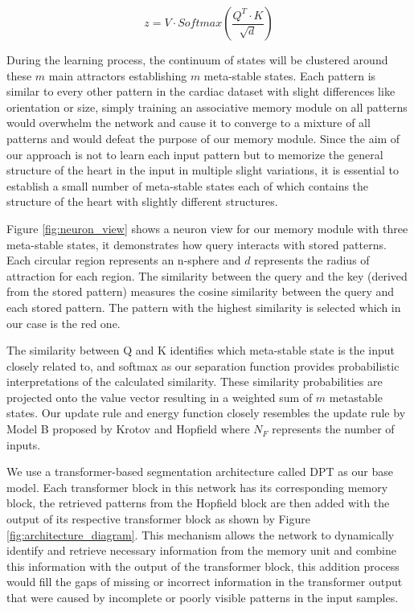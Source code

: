 \documentclass[preprint,12pt]{elsarticle}
\begin{document}
\begin{equation}
    z = V \cdot Softmax \left(\frac{Q^T \cdot K}{\sqrt{d}}\right)
    \label{eq:our_update}
\end{equation}

During the learning process, the continuum of states will be clustered around these $m$ main attractors establishing $m$ meta-stable states. Each pattern is similar to every other pattern in the cardiac dataset with slight differences like orientation or size, simply training an associative memory module on all patterns would overwhelm the network and cause it to converge to a mixture of all patterns and would defeat the purpose of our memory module. Since the aim of our approach is not to learn each input pattern but to memorize the general structure of the heart in the input in multiple slight variations, it is essential to establish a small number of meta-stable states each of which contains the structure of the heart with slightly different structures.



Figure \ref{fig:neuron_view} shows a neuron view for our memory module with three meta-stable states, it demonstrates how query interacts with stored patterns. Each circular region represents an n-sphere and $d$ represents the radius of attraction for each region. The similarity between the query and the key (derived from the stored pattern) measures the cosine similarity between the query and each stored pattern. The pattern with the highest similarity is selected which in our case is the red one.

The similarity between Q and K identifies which meta-stable state is the input closely related to, and softmax as our separation function provides probabilistic interpretations of the calculated similarity. These similarity probabilities are projected onto the value vector resulting in a weighted sum of $m$ metastable states. Our update rule and energy function 
closely resembles the update rule by Model B proposed by Krotov and Hopfield \cite{largeassociativememoryproblem} where $N_F$ represents the number of inputs.





We use a transformer-based segmentation architecture called DPT \cite{dpt} as our base model. Each transformer block in this network has its corresponding memory block, the retrieved patterns from the Hopfield block are then added with the output of its respective transformer block as shown by Figure \ref{fig:architecture_diagram}. This mechanism allows the network to dynamically identify and retrieve necessary information from the memory unit and combine this information with the output of the transformer block, this addition process would fill the gaps of missing or incorrect information in the transformer output that were caused by incomplete or poorly visible patterns in the input samples.
\end{document}
